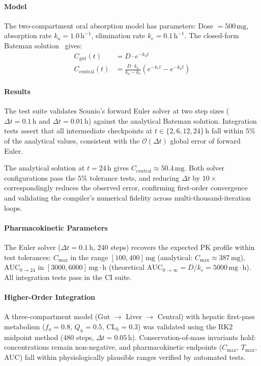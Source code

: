\documentclass[11pt,a4paper]{article}
\begin{document}
\paragraph{Model}
The two-compartment oral absorption model has parameters:
Dose $= 500\,\text{mg}$, absorption rate $k_a = 1.0\,\text{h}^{-1}$,
elimination rate $k_e = 0.1\,\text{h}^{-1}$.
The closed-form Bateman solution~\citep{gibaldi1982pharmacokinetics} gives:
\begin{align}
  C_{\text{gut}}(t) &= D \cdot e^{-k_a t} \\
  C_{\text{central}}(t) &= \frac{D \cdot k_a}{k_a - k_e}
    \left(e^{-k_e t} - e^{-k_a t}\right)
\end{align}

\paragraph{Results}
The test suite validates Sounio's forward Euler solver at two step sizes
($\Delta t = 0.1\,\text{h}$ and $\Delta t = 0.01\,\text{h}$) against the
analytical Bateman solution. Integration tests assert that all intermediate
checkpoints at $t \in \{2, 6, 12, 24\}\,\text{h}$ fall within $5\%$ of
the analytical values, consistent with the $\mathcal{O}(\Delta t)$ global
error of forward Euler.

The analytical solution at $t = 24\,\text{h}$ gives
$C_{\text{central}} \approx 50.4\,\text{mg}$. Both solver configurations
pass the $5\%$ tolerance tests, and reducing $\Delta t$ by $10\times$
correspondingly reduces the observed error, confirming first-order
convergence and validating the compiler's numerical fidelity across
multi-thousand-iteration loops.

\paragraph{Pharmacokinetic Parameters}
The Euler solver ($\Delta t = 0.1\,\text{h}$, 240 steps) recovers the
expected PK profile within test tolerances:
$C_{\max}$ in the range $[100, 400]\,\text{mg}$
(analytical: $C_{\max} \approx 387\,\text{mg}$),
$\text{AUC}_{0 \to 24}$ in $[3000, 6000]\,\text{mg}\!\cdot\!\text{h}$
(theoretical $\text{AUC}_{0 \to \infty} = D/k_e = 5000\,\text{mg}\!\cdot\!\text{h}$).
All integration tests pass in the CI suite.

\paragraph{Higher-Order Integration}
A three-compartment model (Gut $\to$ Liver $\to$ Central) with hepatic
first-pass metabolism ($f_a = 0.8$, $Q_h = 0.5$, $\text{CL}_h = 0.3$)
was validated using the RK2 midpoint method (480 steps, $\Delta t = 0.05\,\text{h}$).
Conservation-of-mass invariants hold: concentrations remain non-negative,
and pharmacokinetic endpoints ($C_{\max}$, $T_{\max}$, AUC) fall within
physiologically plausible ranges verified by automated tests.
\end{document}
